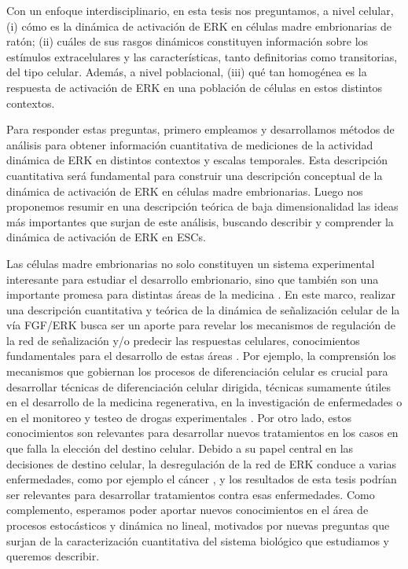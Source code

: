 \documentclass[./main.tex]{subfiles}
\begin{document}
Con un enfoque interdisciplinario, en esta tesis nos preguntamos, a nivel celular, (i) cómo es la dinámica de activación de ERK en células madre embrionarias de ratón; (ii) cuáles de sus rasgos dinámicos constituyen información sobre los estímulos extracelulares y las características, tanto definitorias como transitorias, del tipo celular. Además, a nivel poblacional, (iii) qué tan homogénea es la respuesta de activación de ERK en una población de células en estos distintos contextos.


Para responder estas preguntas, primero empleamos y desarrollamos métodos de análisis para obtener información cuantitativa de mediciones de la actividad dinámica de ERK en distintos contextos y escalas temporales. Esta descripción cuantitativa será fundamental para construir una descripción conceptual de la dinámica de activación de ERK en células madre embrionarias. Luego nos proponemos resumir en una descripción teórica de baja dimensionalidad las ideas más importantes que surjan de este análisis, buscando describir y comprender la dinámica de activación de ERK en ESCs.


Las células madre embrionarias no solo constituyen un sistema experimental interesante para estudiar el desarrollo embrionario, sino que también son una importante promesa para distintas áreas de la medicina \cite{Garreta2021,Waisman2019}. En este marco, realizar una descripción cuantitativa y teórica de la dinámica de señalización celular de la vía FGF/ERK busca ser un aporte para revelar los mecanismos de regulación de la red de señalización y/o predecir las respuestas celulares, conocimientos fundamentales para el desarrollo de estas áreas \cite{Shankaran2009}. Por ejemplo, la comprensión los mecanismos que gobiernan los procesos de diferenciación celular es crucial para desarrollar técnicas de diferenciación celular dirigida, técnicas sumamente útiles en el desarrollo de la medicina regenerativa, en la investigación de enfermedades o en el monitoreo y testeo de drogas experimentales \cite{Keller2005,Inoue2014}. Por otro lado, estos conocimientos son relevantes para desarrollar nuevos tratamientos en los casos en que falla la elección del destino celular. Debido a su papel central en las decisiones de destino celular, la desregulación de la red de ERK conduce a varias enfermedades, como por ejemplo el cáncer \cite{Dessauges2022,Bugaj2018,Lavoie2020,Grieco2013}, y los resultados de esta tesis podrían ser relevantes para desarrollar tratamientos contra esas enfermedades. Como complemento, esperamos poder aportar nuevos conocimientos en el área de procesos estocásticos y dinámica no lineal, motivados por nuevas preguntas que surjan de la caracterización cuantitativa del sistema biológico que estudiamos y queremos describir.
\end{document}
